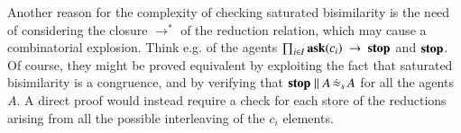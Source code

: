 \documentclass[main.tex]{subfiles}
\begin{document}
Another reason for the complexity of checking saturated bisimilarity is the need of considering 
the closure $\longrightarrow^*$ of the reduction relation, which may cause a combinatorial explosion.
Think e.g. of the agents $\prod_{i \in I} {\bf ask}(c_i) \ \rightarrow \ \mbox{{\bf stop}}$ and $\mbox{{\bf stop}}$. Of course, they might be proved equivalent 
by exploiting the fact that saturated bisimilarity is a congruence, and by verifying that $\mbox{{\bf stop}} \parallel A \,\dot{\approx}_{s}\, A $ for all 
the agents $A$.
%
A direct proof would instead require a check for each store of the reductions arising from all the possible interleaving of the $c_i$
elements.


%
\end{document}
